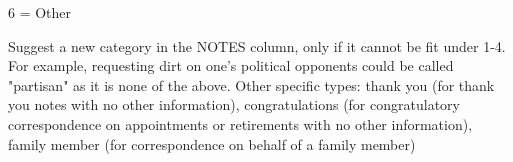 \documentclass[12pt]{article}
\begin{document}
6 = Other \\

\hfill\begin{minipage}{\dimexpr\textwidth-2cm}
	Suggest a new category in the NOTES column, only if it cannot be fit under 1-4. For example, requesting dirt on one's political opponents could be called "partisan" as it is none of the above. Other specific types: thank you (for thank you notes with no other information), congratulations (for congratulatory correspondence on appointments or retirements with no other information), family member (for correspondence on behalf of a family member) \\
\end{minipage}
\end{document}
